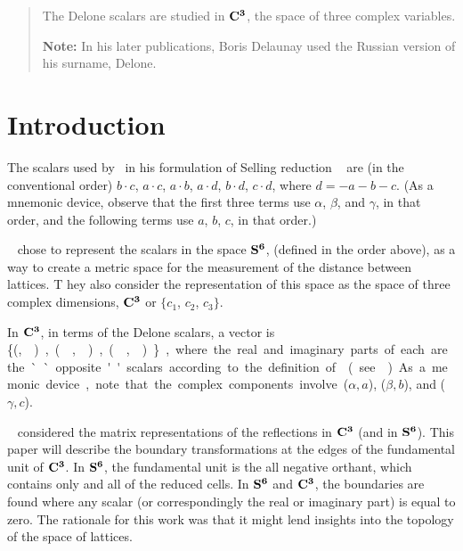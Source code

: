 \documentclass[preprint]{iucr}              %
\numberwithin{equation}{section}
\newcommand{\SVI}[0]{$\bf{S^{6}}$}
\newcommand{\CIII}[0]{$\bf{C^{3}}$}
\begin{document}
	\newcommand{\ci}[0]{$c_1$}
	\newcommand{\cii}[0]{$c_2$}
	\newcommand{\ciii}[0]{$c_3$}
	
	
	\begin{abstract}
		
		The Delone scalars are studied in \CIII, the space of three complex variables.
		
		{\bf Note:}  In his later publications, Boris Delaunay used the Russian version of his surname, Delone.\\
		
		
	\end{abstract}
	
	
	\section{Introduction}
	
	The scalars used by~ in his formulation of Selling reduction ~\cite{Selling1874}
	are (in the conventional order) $b \cdot c$, $a \cdot c$, $a \cdot b$, $a \cdot d$, 
	$b \cdot d$, $c \cdot d$, where $d = -a-b-c$. 
	(As a mnemonic device, 
	observe that the first three terms use
	$\alpha$, $\beta$, and $\gamma$, 
	in that order, 
	and the following terms use $a$, $b$, $c$, in that order.)
	
	~ chose to 
	represent the scalars in the space \SVI{},
	\Svec{} (defined in the order above), 
	as a way to create a metric space
	for the measurement of the distance between lattices. T
	hey also consider the representation of this space as the
	space of three complex dimensions, \CIII{} or 
	{$\{c_1$}, {$c_2$}, {$c_3\}$}. 	
	
	In \CIII{}, in terms of the Delone scalars, 
	a vector is \{(\si,\siv ), (\sii,\sv),(\siii,\svi)\}, 
	where the real and imaginary parts
	of each are the ``opposite'' scalars 
	according to the definition of~ (see~).
	As a memonic device, 
	note that the complex components involve ($\alpha,a$), ($\beta, b$), and ($\gamma,c$).
	
	~ considered the matrix representations 
	of the reflections in \CIII{} (and in \SVI{}). 
	This paper will describe the boundary transformations 
	at the edges of the fundamental	unit of \CIII{}. 
	In \SVI{}, the fundamental unit is the all negative orthant, 
	which contains only and	all of the reduced cells. 
	In \SVI{} and \CIII{}, 
	the boundaries are found where any scalar 
	(or correspondingly the real or imaginary part) 
	is equal to zero. The rationale for this work was 
	that it might lend insights into the topology of
	the space of lattices. 
	
\end{document}
